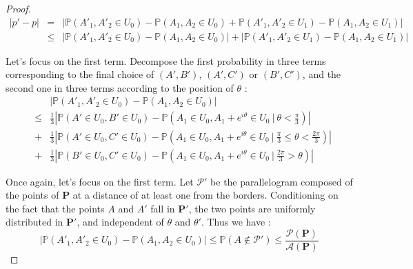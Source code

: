 \documentclass[a4paper,11pt]{article}
\theoremstyle{definition}
\theoremstyle{remark}
\begin{document}
\begin{proof}

\begin{eqnarray*}
|p' - p| 
  &=& | \mathbb{P}(A'_1 , A'_2 \in U_0) - \mathbb{P}(A_1 , A_2 \in U_0) + \mathbb{P}(A'_1 , A'_2 \in U_1) - \mathbb{P}(A_1 , A_2 \in U_1) | \\
  &\leq& | \mathbb{P}(A'_1 , A'_2 \in U_0) - \mathbb{P}(A_1 , A_2 \in U_0) | + | \mathbb{P}(A'_1 , A'_2 \in U_1) - \mathbb{P}(A_1 , A_2 \in U_1) | 
\end{eqnarray*}

Let's focus on the first term. 
Decompose the first probability in three terms corresponding to the final choice of $(A',B')$, $(A',C')$ or $(B',C')$, and the second one in three terms according to the position of $\theta$ :
\begin{eqnarray*}
& & \left| \mathbb{P}(A'_1 , A'_2 \in U_0) - \mathbb{P}(A_1 , A_2 \in U_0) \right| \\
&\leq& \frac{1}{3} \left| \mathbb{P}(A' \in U_0 , B' \in U_0) - \mathbb{P}(A_1 \in U_0 , A_1 + e^{i \theta} \in U_0 \ |\  \theta < \frac{\pi}{3} ) \right| \\
&+& \frac{1}{3} \left| \mathbb{P}(A' \in U_0 , C' \in U_0) - \mathbb{P}(A_1 \in U_0 , A_1 + e^{i \theta} \in U_0 \ |\  \frac{\pi}{3} \leq \theta < \frac{2 \pi}{3} ) \right| \\
&+& \frac{1}{3} \left| \mathbb{P}(B' \in U_0 ,C' \in U_0) - \mathbb{P}(A_1 \in U_0 , A_1 + e^{i \theta} \in U_0 \ | \  \frac{2 \pi}{3} > \theta ) \right|
\end{eqnarray*}

Once again, let's focus on the first term. Let $\mathcal{P'}$ be the parallelogram  composed of the points of  $\mathbf{P}$ at a distance of at least one from the borders. Conditioning on the fact that the points $A$ and $A'$ fall in $\mathbf{P'}$, the two points are uniformly distributed in $\mathbf{P'}$, and independent of $\theta$ and $\theta'$. Thus we have : 
$$ \left| \mathbb{P}(A'_1 , A'_2 \in U_0) - \mathbb{P}(A_1 , A_2 \in U_0) \right| \leq \mathbb P(A \not \in \mathcal{P'}) \leq \frac{\mathcal{P}(\mathbf{P})}{\mathcal{A}(\mathbf{P})} $$


\end{proof}
\end{document}
